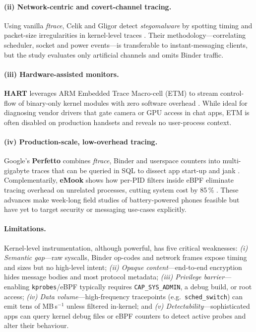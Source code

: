 \documentclass[a4paper,12pt]{report}
\begin{document}
\paragraph{(ii) Network-centric and covert-channel tracing.}
Using vanilla \textit{ftrace}, Celik and Gligor detect
\emph{stegomalware} by spotting timing and packet-size irregularities in
kernel-level traces \cite{celik2021stego}.  Their methodology---correlating
scheduler, socket and power events---is transferable to instant-messaging
clients, but the study evaluates only artificial channels and omits Binder
traffic.

\paragraph{(iii) Hardware-assisted monitors.}
\textbf{HART} leverages ARM Embedded Trace Macro-cell (ETM) to stream
control-flow of binary-only kernel modules with zero software overhead
\cite{zhang2020hart}.  While ideal for diagnosing vendor drivers that gate
camera or GPU access in chat apps, ETM is often disabled on production
handsets and reveals no user-process context.

\paragraph{(iv) Production-scale, low-overhead tracing.}
Google’s \textbf{Perfetto} combines \emph{ftrace}, Binder and userspace
counters into multi-gigabyte traces that can be queried in SQL to dissect
app start-up and jank \cite{maganti2022perfetto}.  Complementarily,
\textbf{eMook} shows how per-PID filters inside eBPF eliminate tracing
overhead on unrelated processes, cutting system cost by 85\,\%
\cite{williams2024emook}.  These advances make week-long field studies of
battery-powered phones feasible but have yet to target security or
messaging use-cases explicitly.

\paragraph{Limitations.}
Kernel-level instrumentation, although powerful, has five critical weaknesses:
\emph{(i) Semantic gap}—raw syscalls, Binder op-codes and network frames expose timing and sizes but no high-level intent;
\emph{(ii) Opaque content}—end-to-end encryption hides message bodies and most protocol metadata;
\emph{(iii) Privilege barrier}—enabling \texttt{kprobes}/eBPF typically requires \texttt{CAP\_SYS\_ADMIN}, a debug build, or root access;
\emph{(iv) Data volume}—high-frequency tracepoints (e.g.\ \texttt{sched\_switch}) can emit tens of MB\,s\(^{-1}\) unless filtered in-kernel; and
\emph{(v) Detectability}—sophisticated apps can query kernel debug files or eBPF counters to detect active probes and alter their behaviour.
\end{document}
